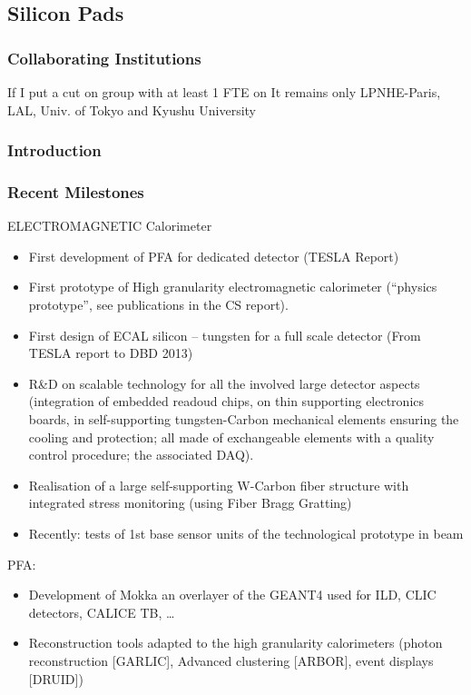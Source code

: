 \subsection{Silicon Pads}
\subsubsection{Collaborating Institutions}
If I put a cut on group with at least 1 FTE on 
It remains only LPNHE-Paris, LAL, Univ. of Tokyo and Kyushu University
\subsubsection{Introduction}
\subsubsection{Recent Milestones}
ELECTROMAGNETIC Calorimeter
\begin{itemize}
	\item First development of PFA for dedicated detector (TESLA Report)
	\item First prototype of High granularity electromagnetic calorimeter (“physics prototype”, see publications in the CS report).
	\item First design of ECAL silicon – tungsten for a full scale detector (From TESLA report to DBD 2013)
	\item R\&D on scalable technology for all the involved large detector aspects (integration of embedded readoud chips, on thin supporting electronics boards, in self-supporting tungsten-Carbon mechanical elements ensuring the cooling and protection; all made of exchangeable elements with a quality control procedure; the associated DAQ).
	\item Realisation of a large self-supporting W-Carbon fiber structure with integrated stress monitoring (using Fiber Bragg Gratting) 
	\item Recently: tests of 1st base sensor units of the technological prototype in beam
\end{itemize}
PFA:
\begin{itemize}
	\item Development of Mokka an overlayer of the GEANT4 used for ILD, CLIC detectors, CALICE TB, …
	\item Reconstruction tools adapted to the high granularity calorimeters (photon reconstruction [GARLIC], Advanced clustering [ARBOR], event displays [DRUID])
\end{itemize}

